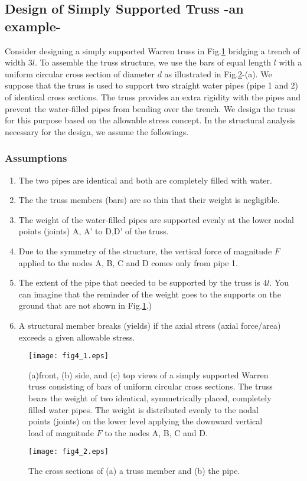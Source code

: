 \documentclass[10pt,a4j]{article}
\begin{document}
\subsection{Design of Simply Supported Truss -an example-}
Consider designing a simply supported Warren truss in Fig.\ref{fig:fig4_1} bridging 
a trench of width $3l$. To assemble the truss structure, we use the bars of equal 
length $l$ with a uniform circular cross section of diameter $d$ as illustrated in Fig.\ref{fig:fig4_2}-(a).
We suppose that the truss is used to support two straight water pipes (pipe 1 and 2) 
of identical cross sections. The truss provides an extra rigidity 
with the pipes and prevent the water-filled pipes from bending over the trench. 
We design the truss for this purpose based on the allowable stress concept.
In the structural analysis necessary for the design, we assume the followings.
\subsubsection{Assumptions}
\begin{enumerate}
\item
	The two pipes are identical and both are completely filled with water. 
\item
	The the truss members (bars) are so thin that their weight is negligible.
\item
	The weight of the water-filled pipes are supported evenly at the lower nodal 
		points (joints) A, A' to D,D' of the truss.
\item
	Due to the symmetry of the structure, the vertical force of magnitude 
	$F$ applied to the nodes A, B, C and D comes only from pipe 1.
\item
	The extent of the pipe that needed to be supported by the truss is $4l$. 
	You can imagine that the reminder of the weight goes to the supports on the 
	ground that are not shown in Fig.\ref{fig:fig4_1}.)
\item
	A structural member breaks (yields) if the axial stress (axial force/area) 
	exceeds a given allowable stress.
\end{enumerate}
\begin{figure}
	\begin{center}
	\texttt{[image: fig4\_1.eps]} 
	\end{center}
	\caption{
		(a)front, (b) side, and (c) top views of a simply supported Warren truss consisting 
		of bars of uniform circular cross sections. 
		The truss bears the weight of two identical, symmetrically placed, completely filled water pipes.
		The weight is distributed evenly to the nodal points (joints) on the lower level 
		applying the downward vertical load of magnitude $F$ to the nodes A, B, C and D.
	}
	\label{fig:fig4_1}
\end{figure}
\begin{figure}
	\begin{center}
	\texttt{[image: fig4\_2.eps]} 
	\end{center}
	\caption{
		The cross sections of (a) a truss member and (b) the pipe.  
	}
	\label{fig:fig4_2}
\end{figure}
\end{document}
